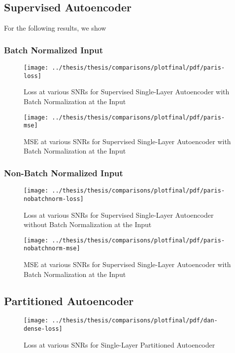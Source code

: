 \subsection{Supervised Autoencoder}

For the following results, we show 

\subsubsection{Batch Normalized Input}

\begin{figure}[!ht]
\centering
\texttt{[image: ../thesis/thesis/comparisons/plotfinal/pdf/paris-loss]}
\caption{Loss at various SNRs for Supervised Single-Layer Autoencoder with Batch Normalization at the Input}
\end{figure}

\begin{figure}[!ht]
\centering
\texttt{[image: ../thesis/thesis/comparisons/plotfinal/pdf/paris-mse]}
\caption{MSE at various SNRs for Supervised Single-Layer Autoencoder with Batch Normalization at the Input}
\end{figure}

\subsubsection{Non-Batch Normalized Input}

\begin{figure}[!ht]
\centering
\texttt{[image: ../thesis/thesis/comparisons/plotfinal/pdf/paris-nobatchnorm-loss]}
\caption{Loss at various SNRs for Supervised Single-Layer Autoencoder without Batch Normalization at the Input}
\end{figure}

\begin{figure}[!ht]
\centering
\texttt{[image: ../thesis/thesis/comparisons/plotfinal/pdf/paris-nobatchnorm-mse]}
\caption{MSE at various SNRs for Supervised Single-Layer Autoencoder with Batch Normalization at the Input}
\end{figure}


\subsection{Partitioned Autoencoder}

\begin{figure}[!ht]
\centering
\texttt{[image: ../thesis/thesis/comparisons/plotfinal/pdf/dan-dense-loss]}
\caption{Loss at various SNRs for Single-Layer Partitioned Autoencoder\cite{stow}}
\end{figure}

